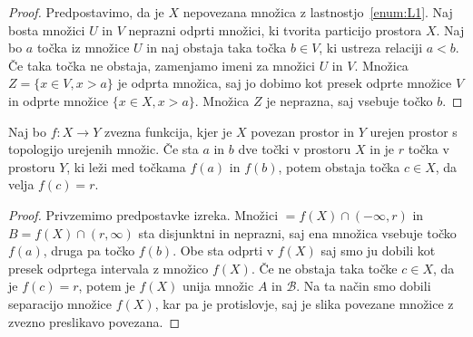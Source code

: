 \documentclass[../TG_magistrsko_delo_sections.tex]{subfiles}
\begin{document}
\begin{proof}
Predpostavimo, da je $X$ nepovezana množica z lastnostjo~\ref{enum:L1}. Naj bosta množici $U$ in $V$ neprazni odprti množici, ki tvorita particijo prostora $X$. Naj bo $a$ točka iz množice $U$ in naj obstaja taka točka $b \in V$, ki ustreza relaciji $a<b$. Če taka točka ne obstaja, zamenjamo imeni za množici $U$ in $V$. Množica $Z = \{x \in V, x>a\}$ je odprta množica, saj jo dobimo kot presek odprte množice $V$ in odprte množice $\{x \in X, x>a\}$. Množica $Z$ je neprazna, saj vsebuje točko $b$. 
\end{proof}

\begin{izrek}
Naj bo $f : X \to Y$ zvezna funkcija, kjer je $X$ povezan prostor in $Y$ urejen prostor s topologijo urejenih množic. Če sta $a$ in $b$ dve točki v prostoru $X$ in je $r$ točka v prostoru $Y$, ki leži med točkama $f(a)$ in $f(b)$, potem obstaja točka $c \in X$, da velja $f(c) = r$.
\end{izrek}
\begin{proof}
Privzemimo predpostavke izreka. Množici $=f(X) \cap (-\infty, r)$ in $B=f(X) \cap (r, \infty)$ sta disjunktni in neprazni, saj ena množica vsebuje točko $f(a)$, druga pa točko $f(b)$. Obe sta odprti v $f(X)$ saj smo ju dobili kot presek odprtega intervala z množico $f(X)$. Če ne obstaja taka točke $c \in X$, da je $f(c) = r$, potem je $f(X)$ unija množic $A$ in $\mathcal{B}$. Na ta način smo dobili separacijo množice $f(X)$, kar pa je protislovje, saj je slika povezane množice z zvezno preslikavo povezana.
\end{proof}
\end{document}
